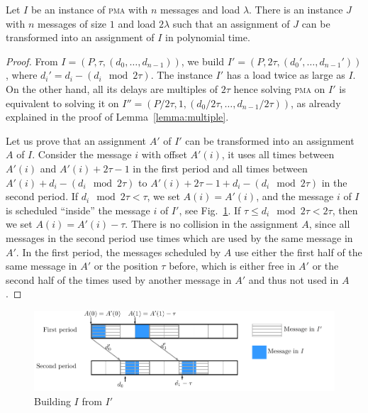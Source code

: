 \documentclass[a4paper,cleveref, autoref, thm-restate,UKenglish]{lipics-v2019}
\newcommand\pma{\textsc{pma}\xspace}
\begin{document}
\begin{theorem}\label{th:double_load}
Let $I$ be an instance of \pma with $n$ messages and load $\lambda$. There is an instance $J$ with $n$ messages of size $1$
and load $2\lambda$ such that an assignment of $J$ can be transformed into an assignment of $I$ in polynomial time.
\end{theorem}
\begin{proof}
From $I = (P,\tau,(d_{0},\dots,d_{n-1}))$, we build $I' = (P, 2\tau, (d_{0}',\dots,d_{n-1}'))$, where $d_i' = d_{i} - (d_{i} \mod 2\tau)$. The instance $I'$ has a load twice as large as $I$.
On the other hand, all its delays are multiples of $2\tau$ hence solving \pma on $I'$ is equivalent to solving it on $I'' = (P/2\tau, 1,(d_{0}/ 2\tau,\dots,d_{n-1} /2\tau))$, as already explained in the proof of Lemma~\ref{lemma:multiple}. 

Let us prove that an assignment $A'$ of $I'$ can be transformed into an assignment $A$ of $I$. 
Consider the message $i$ with offset $A'(i)$, it uses all times between $A'(i)$ and $A'(i) + 2\tau -1$ in the first period and all times between $A'(i) + d_{i} - (d_{i} \mod 2\tau)$ to $A'(i) + 2\tau -1+ d_{i} - (d_{i} \mod 2\tau)$ in the second period. 
If $d_{i} \mod 2\tau < \tau $, we set $A(i) = A'(i)$, and the message $i$ of $I$ is scheduled ``inside'' the 
message $i$ of $I'$, see Fig.~\ref{fig:transf_2tau}. If $\tau \leq d_{i} \mod 2\tau < 2\tau$, then we set 
$A(i) = A'(i) - \tau$. There is no collision in the assignment $A$, since all messages in the second period use
times which are used by the same message in $A'$. In the first period, the messages scheduled by $A$ use either the first
half of the same message in $A'$ or the position $\tau$ before, which is either free in $A'$ or the second half of the times used by another message in $A'$ and thus not used in $A$. 
\end{proof}
\begin{figure}[h]
\begin{center}

\includegraphics[scale=0.7]{transfo2tau}
\end{center}
\caption{Building $I$ from $I'$}
\label{fig:transf_2tau}
\end{figure}
\end{document}
